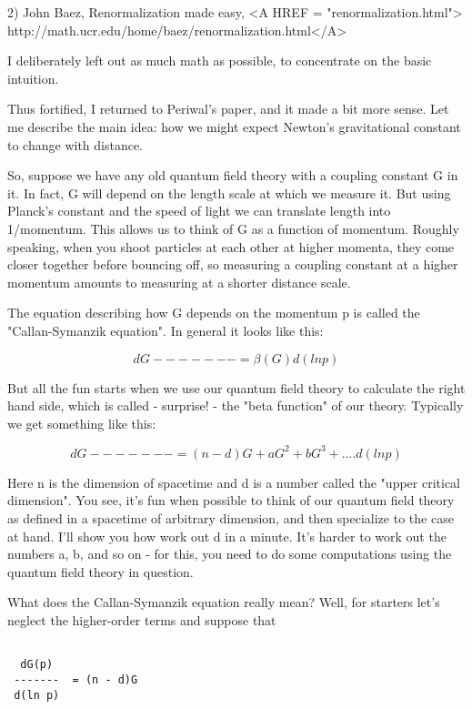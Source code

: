 2) John Baez, Renormalization made easy, <A HREF = "renormalization.html">
http://math.ucr.edu/home/baez/renormalization.html</A>

I deliberately left out as much math as possible, to concentrate 
on the basic intuition.

Thus fortified, I returned to Periwal's paper, and it made a bit 
more sense.  Let me describe the main idea: how we might expect 
Newton's gravitational constant to change with distance.  

So, suppose we have any old quantum field theory with a coupling constant
G in it.  In fact, G will depend on the length scale at which we
measure it.  But using Planck's constant and the speed of light we
can translate length into 1/momentum.  This allows us to think of G
as a function of momentum.   Roughly speaking, when you shoot particles 
at each other at higher momenta, they come closer together before 
bouncing off, so measuring a coupling constant at a higher momentum 
amounts to measuring at a shorter distance scale.  

The equation describing how G depends on the momentum p is called 
the "Callan-Symanzik equation".  In general it looks like this:


$$

   dG
 -------  = \beta (G)
 d(ln p)
$$
    
But all the fun starts when we use our quantum field theory to calculate 
the right hand side, which is called - surprise! - the "beta function" 
of our theory.   Typically we get something like this:


$$

   dG 
 -------  = (n - d)G + aG^{2} + bG^{3} + ....
 d(ln p)
$$
    
Here n is the dimension of spacetime and d is a number called the
"upper critical dimension".  You see, it's fun when possible to think
of our quantum field theory as defined in a spacetime of arbitrary
dimension, and then specialize to the case at hand.  I'll show you 
how work out d in a minute.  It's harder to work out the numbers 
a, b, and so on - for this, you need to do some computations using the 
quantum field theory in question.

What does the Callan-Symanzik equation really mean?  Well, for starters 
let's neglect the higher-order terms and suppose that


\begin{verbatim}

  dG(p) 
 -------  = (n - d)G
 d(ln p)
\end{verbatim}
    
